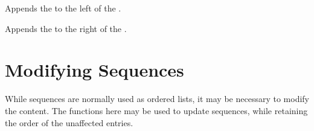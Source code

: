 \documentclass[oneside]{book}
\begin{document}

\begin{function}{\SeqPutLeft}
\begin{syntax}
  
\end{syntax}
Appends the  to the left of the .
\begin{demohigh}
\SeqSetFromClist {}
\SeqPutLeft {}
\SeqVarJoin {}
\end{demohigh}
\end{function}

\begin{function}{\SeqPutRight}
\begin{syntax}
  
\end{syntax}
Appends the  to the right of the .
\begin{demohigh}
\SeqSetFromClist {}
\SeqPutRight {}
\SeqVarJoin {}
\end{demohigh}
\end{function}

\section{Modifying Sequences}

While sequences are normally used as ordered lists, it may be
necessary to modify the content. The functions here may be used
to update sequences, while retaining the order of the unaffected
entries.
\end{document}
